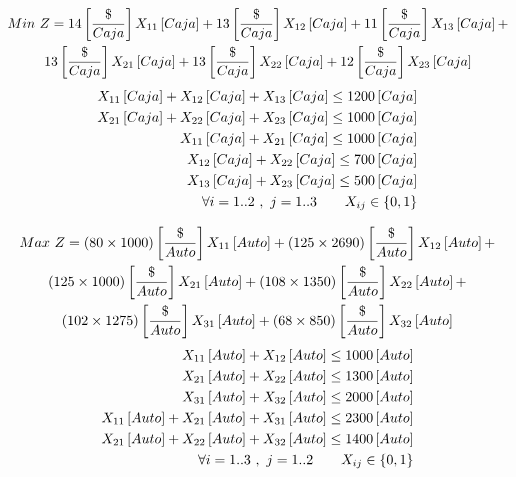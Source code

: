 \documentclass{tarea}
\begin{document}
\begin{homeworkProblem}
\begin{multline}
  Min\ Z = 14\left[ \frac{\$}{Caja} \right]X_{11}\left[ Caja \right] + 13\left[ \frac{\$}{Caja} \right]X_{12}\left[ Caja \right] + 11\left[ \frac{\$}{Caja} \right]X_{13}\left[ Caja \right] + \\
  13\left[ \frac{\$}{Caja} \right]X_{21}\left[ Caja \right] + 13\left[ \frac{\$}{Caja} \right]X_{22}\left[ Caja \right] + 12\left[ \frac{\$}{Caja} \right]X_{23}\left[ Caja \right] 
\end{multline}
\begin{align*}
  X_{11}\left[ Caja \right] + X_{12}\left[ Caja \right] + X_{13}\left[ Caja \right] \le   1200\left[ Caja \right]\\
  X_{21}\left[ Caja \right] + X_{22}\left[ Caja \right] + X_{23}\left[ Caja \right] \le   1000\left[ Caja \right]\\
  X_{11}\left[ Caja \right] + X_{21}\left[ Caja \right]  \le 1000 \left[ Caja \right] \\
  X_{12}\left[ Caja \right] + X_{22}\left[ Caja \right]  \le 700 \left[ Caja \right]\\
  X_{13}\left[ Caja \right] + X_{23}\left[ Caja \right]  \le 500 \left[ Caja \right]\\
    \forall i=1..2\ ,\ j=1..3\quad \quad X_{ij} \in \{0,1 \}
\end{align*}
\end{homeworkProblem}


\begin{homeworkProblem}[-1][MG Auto]
\begin{multline}
  Max\ Z = \left( 80 \times 1000 \right)\left[ \frac{\$}{Auto} \right]X_{11}\left[ Auto \right] +
           \left( 125 \times 2690 \right)\left[ \frac{\$}{Auto} \right]X_{12}\left[ Auto \right] + \\
           \left( 125 \times 1000 \right)\left[ \frac{\$}{Auto} \right]X_{21}\left[ Auto \right] + 
           \left( 108 \times 1350 \right)\left[ \frac{\$}{Auto} \right]X_{22}\left[ Auto \right] + \\
           \left( 102 \times 1275 \right)\left[ \frac{\$}{Auto} \right]X_{31}\left[ Auto \right] + 
           \left( 68 \times 850 \right)\left[ \frac{\$}{Auto} \right]X_{32}\left[ Auto \right]
\end{multline}
\begin{align*}
  X_{11}\left[ Auto \right] + X_{12}\left[ Auto \right]                       \le 1000 \left[ Auto \right] \\
  X_{21}\left[ Auto \right] + X_{22}\left[ Auto \right]                       \le 1300 \left[ Auto \right] \\
  X_{31}\left[ Auto \right] + X_{32}\left[ Auto \right]                       \le 2000 \left[ Auto \right] \\
  X_{11}\left[ Auto \right] + X_{21}\left[ Auto \right] + X_{31}\left[ Auto \right] \le 2300 \left[ Auto \right] \\
  X_{21}\left[ Auto \right] + X_{22}\left[ Auto \right] + X_{32}\left[ Auto \right] \le 1400 \left[ Auto \right] \\
  \forall i=1..3\ ,\ j=1..2\quad \quad X_{ij} \in \{0,1 \}
\end{align*}
\end{homeworkProblem}
\end{document}
